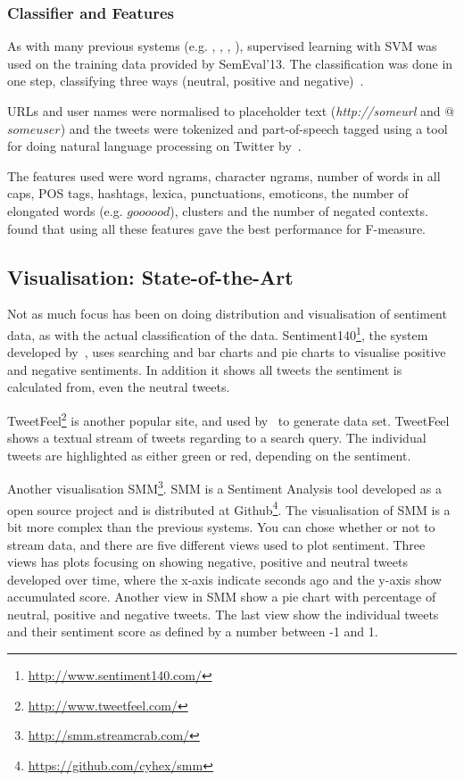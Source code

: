 \subsubsection{Classifier and Features}

As with many previous systems (e.g. \cite{article:bermingham}, \cite{chamlertwat2012discovering}, \cite{zhang2011combining}, \cite{asiaee2012if}), supervised learning with SVM was used on the training data provided by SemEval'13. The classification was done in one step, classifying three ways (neutral, positive and negative)~\citep{MohammadEA:13}.

URLs and user names were normalised to placeholder text (\textit{http://someurl} and  $@$$someuser$) and the tweets were tokenized and part-of-speech tagged using a tool for doing natural language processing on Twitter by~\cite{gimpel2010part}. 

The features used were word ngrams, character ngrams, number of words in all caps, POS tags, hashtags, lexica, punctuations, emoticons, the number of elongated words (e.g. $goooood$), clusters and the number of negated contexts. \cite{MohammadEA:13} found that using all these features gave the best performance for F-measure.


\subsection{Visualisation: State-of-the-Art}

Not as much focus has been on doing distribution and visualisation of sentiment data, as with the actual classification of the data. Sentiment140\footnote{\url{http://www.sentiment140.com/}}, the system developed by~\cite{article:go}, uses searching and bar charts and pie charts to visualise positive and negative sentiments. In addition it shows all tweets the sentiment is calculated from, even the neutral tweets. 

TweetFeel\footnote{\url{http://www.tweetfeel.com/}} is another popular site, and used by~\cite{barbosa2010robust} to generate data set. TweetFeel shows a textual stream of tweets regarding to a search query. The individual tweets are highlighted as either green or red, depending on the sentiment.

Another visualisation SMM\footnote{\url{http://smm.streamcrab.com/}}. SMM is a Sentiment Analysis tool developed as a open source project and is distributed at Github\footnote{\url{https://github.com/cyhex/smm}}. The visualisation of SMM is a bit more complex than the previous systems. You can chose whether or not to stream data, and there are five different views used to plot sentiment. Three views has plots focusing on showing negative, positive and neutral tweets developed over time, where the x-axis indicate seconds ago and the y-axis show accumulated score. Another view in SMM show a pie chart with percentage of neutral, positive and negative tweets. The last view show the individual tweets and their sentiment score as defined by a number between -1 and 1.

